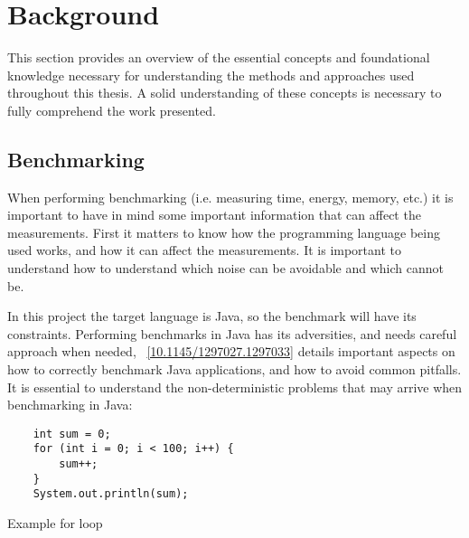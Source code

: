 \usepackage{xcolor}
\chapter{Background}\label{chapter:background}

This section provides an overview of the essential concepts and foundational knowledge necessary for understanding the methods and approaches used throughout this thesis. A solid understanding of these concepts is necessary to fully comprehend the work presented.

\section{Benchmarking} \label{sec:background_benchmarking}

When performing benchmarking (i.e. measuring time, energy, memory, etc.) it is important to have in mind some important information that can affect the measurements. First it matters to know how the programming language being used works, and how it can affect the measurements. It is important to understand how to understand which noise can be avoidable and which cannot be.

In this project the target language is Java, so the benchmark will have its constraints. Performing benchmarks in Java has its adversities, and needs careful approach when needed, ~\cref{10.1145/1297027.1297033} details important aspects on how to correctly benchmark Java applications, and how to avoid common pitfalls.
It is essential to understand the non-deterministic problems that may arrive when benchmarking in Java:

\begin{listing}[H]
\begin{verbatim}
    int sum = 0;
    for (int i = 0; i < 100; i++) {
        sum++;
    }
    System.out.println(sum);
\end{verbatim}
\caption{Example for loop}            
\label{lst:for_loop_example}
\end{listing}


